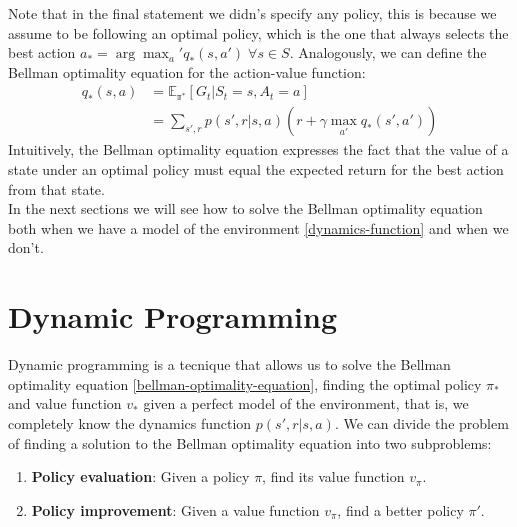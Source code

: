 Note that in the final statement we didn's specify any policy, this is because we assume to be following an optimal policy, which is the one that always selects the best action $a_* = \arg \max_a' q_*(s, a') \; \forall s \in S$.
Analogously, we can define the Bellman optimality equation for the action-value function:
\begin{equation}
    \begin{split}
        q_{*}(s, a) & = \mathds{E_{\pi^*}}[G_t | S_t = s, A_t = a] \\
        & = \sum_{s', r} p(s', r | s, a) (r + \gamma \max_{a'} q_*(s', a'))
    \end{split}
    \label{bellman-optimality-equation-action-value}
\end{equation}
Intuitively, the Bellman optimality equation expresses the fact that the value of a state under an optimal policy must equal the expected return for the best action from that state.\\
In the next sections we will see how to solve the Bellman optimality equation both when we have a model of the environment \ref{dynamics-function} and when we don't.

\section{Dynamic Programming}
Dynamic programming is a tecnique that allows us to solve the Bellman optimality equation \ref{bellman-optimality-equation}, finding the optimal policy $\pi_*$ and value function $v_*$ given a perfect model of the environment, that is, we completely know the dynamics function $p(s', r | s, a)$.
We can divide the problem of finding a solution to the Bellman optimality equation into two subproblems:
\begin{enumerate}
    \item \textbf{Policy evaluation}: Given a policy $\pi$, find its value function $v_{\pi}$.
    \item \textbf{Policy improvement}: Given a value function $v_{\pi}$, find a better policy $\pi'$.
\end{enumerate}


